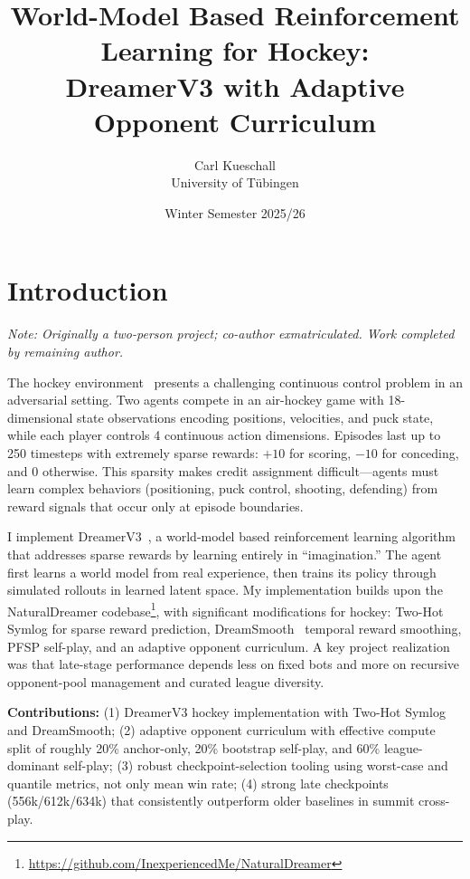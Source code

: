 \documentclass[11pt]{article}
\title{World-Model Based Reinforcement Learning for Hockey:\\
        DreamerV3 with Adaptive Opponent Curriculum}
\author{Carl Kueschall\\
        University of T\"ubingen}
\date{Winter Semester 2025/26}
\begin{document}
\maketitle

\section{Introduction}\label{sec:intro}

\textit{Note: Originally a two-person project; co-author exmatriculated. Work completed by remaining author.}

\medskip
The hockey environment~\cite{martius2024} presents a challenging continuous control problem in an adversarial setting. Two agents compete in an air-hockey game with 18-dimensional state observations encoding positions, velocities, and puck state, while each player controls 4 continuous action dimensions. Episodes last up to 250 timesteps with extremely sparse rewards: $+10$ for scoring, $-10$ for conceding, and $0$ otherwise. This sparsity makes credit assignment difficult---agents must learn complex behaviors (positioning, puck control, shooting, defending) from reward signals that occur only at episode boundaries.

I implement DreamerV3~\cite{hafner2024}, a world-model based reinforcement learning algorithm that addresses sparse rewards by learning entirely in ``imagination.'' The agent first learns a world model from real experience, then trains its policy through simulated rollouts in learned latent space. My implementation builds upon the NaturalDreamer codebase\footnote{\url{https://github.com/InexperiencedMe/NaturalDreamer}}, with significant modifications for hockey: Two-Hot Symlog for sparse reward prediction, DreamSmooth~\cite{dreamsmooth2023} temporal reward smoothing, PFSP self-play, and an adaptive opponent curriculum. A key project realization was that late-stage performance depends less on fixed bots and more on recursive opponent-pool management and curated league diversity.

\textbf{Contributions:} (1) DreamerV3 hockey implementation with Two-Hot Symlog and DreamSmooth; (2) adaptive opponent curriculum with effective compute split of roughly 20\% anchor-only, 20\% bootstrap self-play, and 60\% league-dominant self-play; (3) robust checkpoint-selection tooling using worst-case and quantile metrics, not only mean win rate; (4) strong late checkpoints (556k/612k/634k) that consistently outperform older baselines in summit cross-play.
\end{document}
